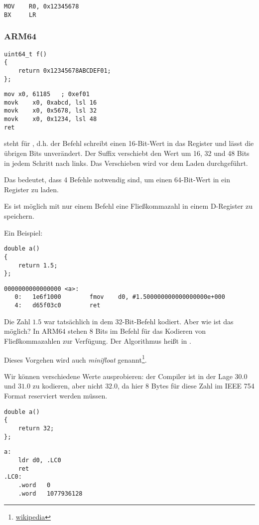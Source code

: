 \begin{lstlisting}[style=customasmARM]
MOV    R0, 0x12345678
BX     LR
\end{lstlisting}

\subsubsection{ARM64}

\begin{lstlisting}[style=customc]
uint64_t f()
{
	return 0x12345678ABCDEF01;
};
\end{lstlisting}

\begin{lstlisting}[caption=GCC 4.9.1 -O3,style=customasmARM]
mov	x0, 61185   ; 0xef01
movk	x0, 0xabcd, lsl 16
movk	x0, 0x5678, lsl 32
movk	x0, 0x1234, lsl 48
ret
\end{lstlisting}

 steht für , d.h. der Befehl schreibt einen 16-Bit-Wert in das Register und lässt die übrigen Bits
unverändert.
Der Suffix  verschiebt den Wert um 16, 32 und 48 Bits in jedem Schritt nach links. Das Verschieben wird vor dem
Laden durchgeführt.

Das bedeutet, dass 4 Befehle notwendig sind, um einen 64-Bit-Wert in ein Register zu laden.

Es ist möglich mit nur einem Befehl eine Fließkommazahl in einem D-Register zu speichern.

Ein Beispiel:

\begin{lstlisting}[style=customc]
double a()
{
	return 1.5;
};
\end{lstlisting}

\begin{lstlisting}[caption=GCC 4.9.1 -O3 + objdump,style=customasmARM]
0000000000000000 <a>:
   0:   1e6f1000        fmov    d0, #1.500000000000000000e+000
   4:   d65f03c0        ret
\end{lstlisting}
Die Zahl $1.5$ war tatsächlich in dem 32-Bit-Befehl kodiert. Aber wie ist das möglich?
In ARM64 stehen 8 Bits im  Befehl für das Kodieren von Fließkommazahlen zur Verfügung.
Der Algorithmus heißt  in \ARMSixFourRefURL. 


Dieses Vorgehen wird auch \emph{minifloat} genannt\footnote{\href{http://en.wikipedia.org/wiki/Minifloat}{wikipedia}}.

Wir können verschiedene Werte ausprobieren: der Compiler ist in der Lage $30.0$ und $31.0$ zu kodieren, aber nicht
$32.0$, da hier 8 Bytes für diese Zahl im IEEE 754 Format reserviert werden müssen.

\begin{lstlisting}[style=customc]
double a()
{
	return 32;
};
\end{lstlisting}

\begin{lstlisting}[caption=GCC 4.9.1 -O3,style=customasmARM]
a:
	ldr	d0, .LC0
	ret
.LC0:
	.word	0
	.word	1077936128
\end{lstlisting}
